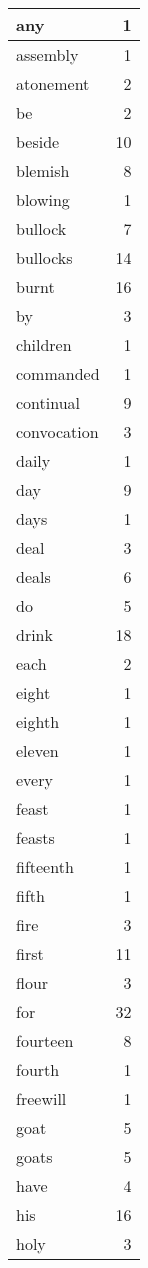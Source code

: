 \begin{center}
\begin{longtable}{l|r}
any & 1\\ \hline 
assembly & 1\\ \hline 
atonement & 2\\ \hline 
be & 2\\ \hline 
beside & 10\\ \hline 
blemish & 8\\ \hline 
blowing & 1\\ \hline 
bullock & 7\\ \hline 
bullocks & 14\\ \hline 
burnt & 16\\ \hline 
by & 3\\ \hline 
children & 1\\ \hline 
commanded & 1\\ \hline 
continual & 9\\ \hline 
convocation & 3\\ \hline 
daily & 1\\ \hline 
day & 9\\ \hline 
days & 1\\ \hline 
deal & 3\\ \hline 
deals & 6\\ \hline 
do & 5\\ \hline 
drink & 18\\ \hline 
each & 2\\ \hline 
eight & 1\\ \hline 
eighth & 1\\ \hline 
eleven & 1\\ \hline 
every & 1\\ \hline 
feast & 1\\ \hline 
feasts & 1\\ \hline 
fifteenth & 1\\ \hline 
fifth & 1\\ \hline 
fire & 3\\ \hline 
first & 11\\ \hline 
flour & 3\\ \hline 
for & 32\\ \hline 
fourteen & 8\\ \hline 
fourth & 1\\ \hline 
freewill & 1\\ \hline 
goat & 5\\ \hline 
goats & 5\\ \hline 
have & 4\\ \hline 
his & 16\\ \hline 
holy & 3\\ \hline 

\end{longtable}
\end{center}
